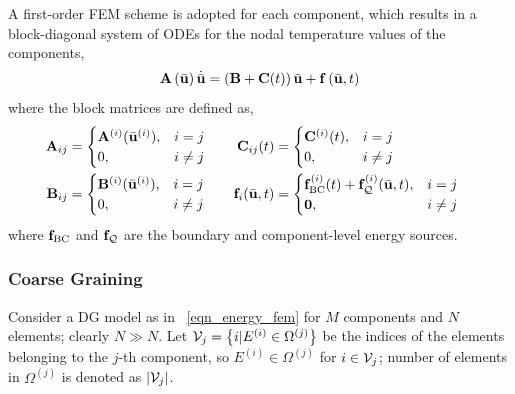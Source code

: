 A first-order FEM scheme is adopted for each component, which results in a block-diagonal system of ODEs for the nodal temperature values of the components,
\begin{equation}
    \mathbf{A}\left(\bar{\mathbf{u}}\right)\dot{\bar{\mathbf{u}}} = \left(\mathbf{B} + \mathbf{C}(t)\right)\bar{\mathbf{u}} + \mathbf{f}\left(\bar{\mathbf{u}},t\right)\label{eqn_rpm}
\end{equation}
where the block matrices are defined as,
\begin{subequations}
\begin{align}
\begin{aligned}
    \mathbf{A}_{ij} &= \begin{cases}
        \mathbf{A}^{(i)}(\bar{\mathbf{u}}^{(i)}), & i=j \\
        0, & i\neq j
    \end{cases}\\
    \mathbf{B}_{ij} &= \begin{cases}
        \mathbf{B}^{(i)}(\bar{\mathbf{u}}^{(i)}), & i=j \\
        0, & i\neq j
    \end{cases}
\end{aligned}
&\qquad
\begin{aligned}
    \mathbf{C}_{ij}(t) &= \begin{cases}
        \mathbf{C}^{(i)}(t), & i=j \\
        0, & i\neq j
    \end{cases}\\
    \mathbf{f}_i(\bar{\mathbf{u}},t) &= \begin{cases}
        \mathbf{f}^{(i)}_{\text{BC}}(t)+\mathbf{f}^{(i)}_{\mathcal{Q}}(\bar{\mathbf{u}},t), & i=j \\
        \boldsymbol{0}, & i\neq j
    \end{cases}
\end{aligned}\label{eqn_rpm_matrices}
\end{align}
\end{subequations}
where $\mathbf{f}_{\text{BC}}$ and $\mathbf{f}_{\mathcal{Q}}$ are the boundary and component-level energy sources. 


\subsubsection{Coarse Graining}

Consider a DG model as in ~\cref{eqn_energy_fem} for $M$ components and $N$ elements; clearly $N\gg N$. Let $\mathcal{V}_j=\left\{i | E^{(i)}\in\Omega^{(j)}\right\}$ be the indices of the elements belonging to the $j$-th component, so $E^{(i)}\in\Omega^{(j)}$ for $i\in\mathcal{V}_j$; number of elements in $\Omega^{(j)}$ is denoted as $\left|\mathcal{V}_j\right|$.



